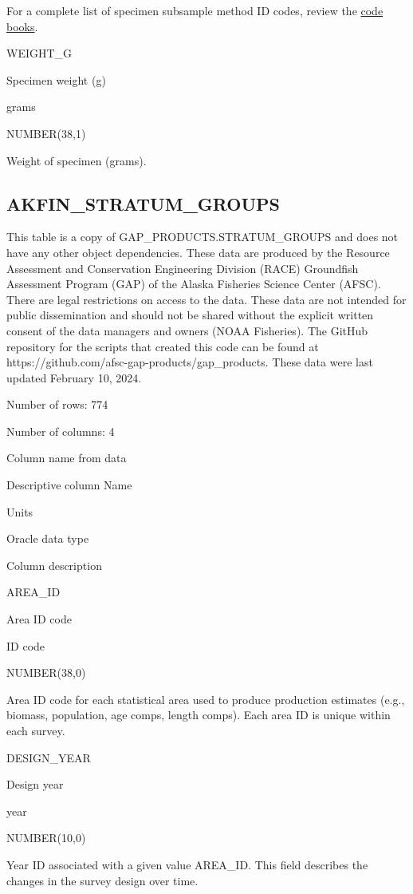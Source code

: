 \documentclass[
  letterpaper,
  oneside,
  open=any]{scrbook}
\begin{document}
For a complete list of specimen subsample method ID codes, review the
\href{https://www.fisheries.noaa.gov/resource/document/groundfish-survey-species-code-manual-and-data-codes-manual}{code
books}.

WEIGHT\_G

Specimen weight (g)

grams

NUMBER(38,1)

Weight of specimen (grams).

\hypertarget{akfin_stratum_groups}{%
\subsection{AKFIN\_STRATUM\_GROUPS}\label{akfin_stratum_groups}}

This table is a copy of GAP\_PRODUCTS.STRATUM\_GROUPS and does not have
any other object dependencies. These data are produced by the Resource
Assessment and Conservation Engineering Division (RACE) Groundfish
Assessment Program (GAP) of the Alaska Fisheries Science Center (AFSC).
There are legal restrictions on access to the data. These data are not
intended for public dissemination and should not be shared without the
explicit written consent of the data managers and owners (NOAA
Fisheries). The GitHub repository for the scripts that created this code
can be found at https://github.com/afsc-gap-products/gap\_products.
These data were last updated February 10, 2024.

Number of rows: 774

Number of columns: 4

Column name from data

Descriptive column Name

Units

Oracle data type

Column description

AREA\_ID

Area ID code

ID code

NUMBER(38,0)

Area ID code for each statistical area used to produce production
estimates (e.g., biomass, population, age comps, length comps). Each
area ID is unique within each survey.

DESIGN\_YEAR

Design year

year

NUMBER(10,0)

Year ID associated with a given value AREA\_ID. This field describes the
changes in the survey design over time.
\end{document}
